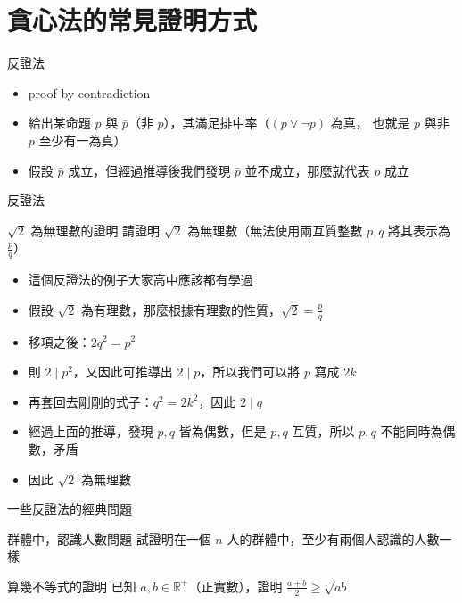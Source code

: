\documentclass[aspectratio=169]{beamer}
\begin{document}
    \section{貪心法的常見證明方式}

    \begin{frame}{反證法}
        \begin{itemize}
            \item<1-> proof by contradiction
            \item<1-> 給出某命題 $p$ 與 $\bar{p}$（非 $p$），其滿足排中率（${\displaystyle (p\vee \neg p)}$ 為真，
            也就是 $p$ 與非 $p$ 至少有一為真）
            \item<2-> 假設 $\bar{p}$ 成立，但經過推導後我們發現 $\bar{p}$ 並不成立，那麼就代表 $p$ 成立
        \end{itemize}
    \end{frame}

    \begin{frame}{反證法}
        \begin{block}{$\sqrt{2}$ 為無理數的證明}
            請證明 $\sqrt{2}$ 為無理數（無法使用兩互質整數 $p, q$ 將其表示為 $\frac{p}{q}$）
        \end{block}

        \begin{itemize}
            \item<1-> 這個反證法的例子大家高中應該都有學過
            \item<2-> 假設 $\sqrt{2}$ 為有理數，那麼根據有理數的性質，$\sqrt{2} = \frac{p}{q}$
            \item<3-> 移項之後：$2q^2 = p^2$
            \item<4-> 則 $2 \mid p^2$，又因此可推導出 $2 \mid p$，所以我們可以將 $p$ 寫成 $2k$
            \item<5-> 再套回去剛剛的式子：$q^2 = 2k^2$，因此 $2 \mid q$
            \item<6-> 經過上面的推導，發現 $p, q$ 皆為偶數，但是 $p, q$ 互質，所以 $p, q$ 不能同時為偶數，矛盾
            \item<7-> 因此 $\sqrt{2}$ 為無理數
        \end{itemize}
    \end{frame}

    \begin{frame}{一些反證法的經典問題}
        \begin{block}{群體中，認識人數問題}
            試證明在一個 $n$ 人的群體中，至少有兩個人認識的人數一樣
        \end{block}

        \begin{block}{算幾不等式的證明}
            已知 $a, b \in \mathbb{R}^+$（正實數），證明 $\frac{a + b}{2} \ge \sqrt{ab}$
        \end{block}
    \end{frame}
    
\end{document}
